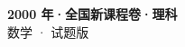 \documentclass[zihao=-4, a4paper]{ctexart}
\begin{document}
\begin{center}
  {\Large\bfseries 2000 年·全国新课程卷·理科}\\[4pt]
  {\large 数学 · 试题版}
\end{center}
\medskip
{}

\end{document}
